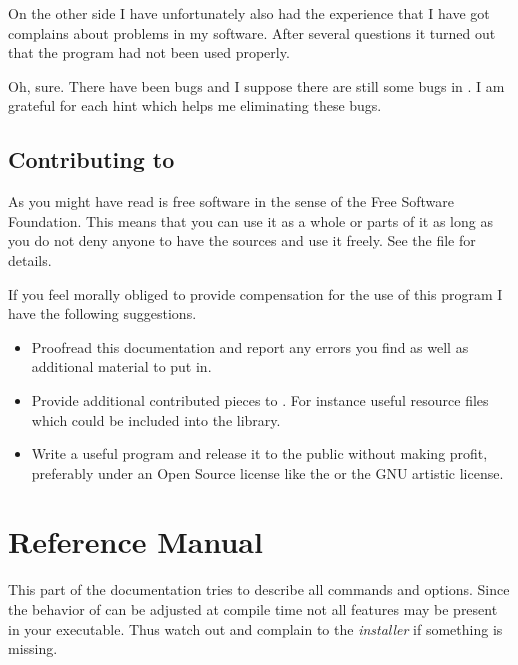 \documentclass[11pt,a4paper]{scrbook}
\begin{document}
On the other side I have unfortunately also had the experience that I have got
complains about problems in my software. After several questions it turned out
that the program had not been used properly.

Oh, sure. There have been bugs and I suppose there are still some bugs in
\BibTool. I am grateful for each hint which helps me eliminating these bugs.



\section{Contributing to \BibTool}

As you might have read \BibTool{} is free software in the sense of the Free
Software Foundation. This means that you can use it as a whole or parts of it
as long as you do not deny anyone to have the sources and use it freely. See
the file  for details.

If you feel morally obliged to provide compensation for the use of this
program I have the following suggestions.

\begin{itemize}
\item Proofread this documentation and report any errors you find as well as
  additional material to put in.
\item Provide additional contributed pieces to \BibTool. For instance useful
  resource files which could be included into the library.
\item Write a useful program and release it to the public without making
  profit, preferably under an Open Source license like the  or the GNU artistic license.
\end{itemize}


\appendix
\chapter{Reference Manual}

This part of the documentation tries to describe all commands and options.
Since the behavior of \BibTool{} can be adjusted at compile time not all
features may be present in your executable. Thus watch out and complain to the
\emph{installer} if something is missing.
\end{document}
